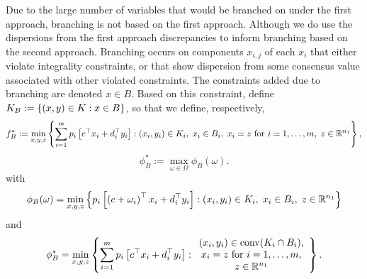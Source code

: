 Due to the large number of variables that would be branched on under the first approach, branching is not based on the first approach. Although we do use the dispersions from the first approach discrepancies to inform branching based on the second approach. 
Branching occurs on components $x_{i,j}$ of each $x_i$ that either violate integrality constraints, or that show dispersion from some consensus value associated with other violated constraints.
The constraints added due to branching are denoted $x \in B$. Based on this constraint, define $K_B:=\left\{ (x,y) \in K : x \in B \right \}$, so that we define, respectively,
\begin{equation}\label{P1B}
f_B^*:=\min_{x,y,z} \left\{ \sum_{i=1}^m p_i \left[ c^\top x_i + d_i^\top y_i \right] : (x_i,y_i) \in K_i,\; x_i \in B_i,\;  x_i=z \text{ for }i=1,\dots,m,\; z \in \mathbb{R}^{n_1} \right \},
\end{equation}
\begin{equation}\label{D1B}
\phi_{B}^*:=\max_{\omega \in \Omega} \phi_B(\omega).
\end{equation}
with
\begin{equation}\label{PhiCB}
\phi_B(\omega) = \min_{x,y,z} \left\{ p_i \left[ \left(c+\omega_i\right)^\top x_i + d_i^\top y_i \right] : (x_i,y_i) \in K_i,\; x_i \in B_i,\; z \in \mathbb{R}^{n_1} \right \}
\end{equation} 
and
\begin{equation}\label{D2B}
\phi_{B}^*=\min_{x,y,z} \left\{ \sum_{i=1}^m p_i \left[ c^\top x_i + d_i^\top y_i \right] : \begin{array}{c}(x_i,y_i) \in \operatorname{conv}(K_i \cap B_i),\\  x_i=z \text{ for }i=1,\dots,m,\\ z \in \mathbb{R}^{n_1}\end{array} \right \}.
\end{equation}




